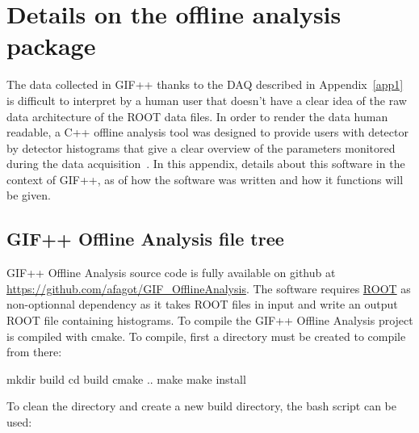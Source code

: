 
\graphicspath{{chapt_dutch/}{intro/}{chapt2/}{chapt3/}{chapt4/}{chapt5/}{chapt6/}{chapt7/}}

\renewcommand\evenpagerightmark{{\scshape\small Appendix B}}
\renewcommand\oddpageleftmark{{\scshape\small Details on the online analysis package}}

\renewcommand{\bibname}{References}

\hyphenation{}

\chapter[Details on the offline analysis package]%
{Details on the offline analysis package}
\label{app2}

The data collected in GIF++ thanks to the DAQ described in Appendix~\ref{app1} is difficult to interpret by a human user that doesn't have a clear idea of the raw data architecture of the ROOT data files. In order to render the data human readable, a C++ offline analysis tool was designed to provide users with detector by detector histograms that give a clear overview of the parameters monitored during the data acquisition~\cite{GIFOffline}. In this appendix, details about this software in the context of GIF++, as of how the software was written and how it functions will be given.

\section{GIF++ Offline Analysis file tree}
\label{app2:sec:code}

	GIF++ Offline Analysis source code is fully available on github at \url{https://github.com/afagot/GIF_OfflineAnalysis}. The software requires \href{https://root.cern.ch/downloading-root}{ROOT} as non-optionnal dependency as it takes ROOT files in input and write an output ROOT file containing histograms. To compile the GIF++ Offline Analysis project is compiled with cmake. To compile, first a  directory must be created to compile from there:\\

	\begin{bashcode}
 mkdir build
 cd build
 cmake ..
 make
 make install
	\end{bashcode}
\vspace{5mm}
	To clean the directory and create a new build directory, the bash script  can be used:\\
	
